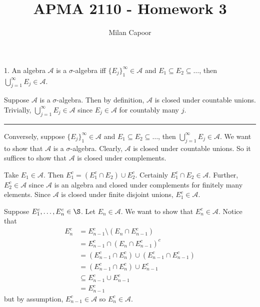 \documentclass[12pt]{article}
\title{APMA 2110 - Homework 3}
\author{Milan Capoor}
\date{}
\newcommand{\sub}{\subseteq}
\renewcommand{\div}{\vspace*{10pt}\hrule\vspace*{10pt}}
\newcommand{\A}{\mathcal{A}}
\begin{document}
\maketitle

1. An algebra $\A$ is a $\sigma$-algebra iff $\{E_j\}_{1}^{\infty} \in \A$ and $E_1 \sub E_2 \sub \dots$, then $\bigcup_{j=1}^{\infty} E_j \in \A$.

    \color{blue}
        Suppose $\A$ is a $\sigma$-algebra. Then by definition, $\A$ is closed under countable unions. Trivially, $\bigcup_{j=1}^{\infty} E_j \in \A$ since $E_j \in \A$ for countably many $j$. 

        \div

        Conversely, suppose $\{E_j\}_{1}^{\infty} \in \A$ and $E_1 \sub E_2 \sub \dots$, then $\bigcup_{j=1}^{\infty} E_j \in \A$. We want to show that $\A$ is a $\sigma$-algebra. Clearly, $\A$ is closed under countable unions. So it suffices to show that $\A$ is closed under complements. 
        
        Take $E_1 \in \A$. Then $E_1^c = (E_1^c \cap E_2) \cup E_2^c$. Certainly $E_1^c \cap E_2 \in \A$. Further, $E_2^c \in \A$ since $\A$ is an algebra and closed under complements for finitely many elements. Since $\A$ is closed under finite disjoint unions, $E_1^c \in \A$. 
        
        Suppose $E_1^c, \dots, E_{n}^c \in \S$. Let $E_n \in \A$. We want to show that $E_n^c \in \A$. Notice that 
        \begin{align*}
            E_n^c &= E_{n-1}^c \setminus (E_n \cap E_{n-1}^c)\\ 
                &= E_{n-1}^c \cap (E_{n} \cap E_{n-1}^c)^c\\ 
                &= (E_{n-1}^c \cap E_{n}^c) \cup (E_{n-1}^c \cap E_{n-1}^c)\\ 
                &= (E_{n-1}^c \cap E_{n}^c) \cup E_{n-1}^c\\ 
                &\sub E_{n-1}^c \cup E_{n-1}^c\\ 
                &= E_{n-1}^c
        \end{align*}
        but by assumption, $E_{n-1}^c \in \A$ so $E_n^c \in \A$. 
        
    \color{black}


\pagebreak
\end{document}
